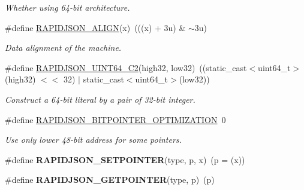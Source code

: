 \begin{DoxyCompactItemize}
\begin{DoxyCompactList}\small\item\em Whether using 64-\/bit architecture. \end{DoxyCompactList}\item 
\#define \hyperlink{a00833_ga583915242504c7fdb36e826f02f76242}{R\+A\+P\+I\+D\+J\+S\+O\+N\+\_\+\+A\+L\+I\+GN}(x)~(((x) + 3u) \& $\sim$3u)
\begin{DoxyCompactList}\small\item\em Data alignment of the machine. \end{DoxyCompactList}\item 
\#define \hyperlink{a00677_aaee1245f375a71be1ac9b8a07ba5fb8f}{R\+A\+P\+I\+D\+J\+S\+O\+N\+\_\+\+U\+I\+N\+T64\+\_\+\+C2}(high32,  low32)~((static\+\_\+cast$<$uint64\+\_\+t$>$(high32) $<$$<$ 32) $\vert$ static\+\_\+cast$<$uint64\+\_\+t$>$(low32))
\begin{DoxyCompactList}\small\item\em Construct a 64-\/bit literal by a pair of 32-\/bit integer. \end{DoxyCompactList}\item 
\#define \hyperlink{a00833_ga93fb983f78208d12c822376e1ea6d185}{R\+A\+P\+I\+D\+J\+S\+O\+N\+\_\+B\+I\+T\+P\+O\+I\+N\+T\+E\+R\+\_\+\+O\+P\+T\+I\+M\+I\+Z\+A\+T\+I\+ON}~0
\begin{DoxyCompactList}\small\item\em Use only lower 48-\/bit address for some pointers. \end{DoxyCompactList}\item 
\#define {\bfseries R\+A\+P\+I\+D\+J\+S\+O\+N\+\_\+\+S\+E\+T\+P\+O\+I\+N\+T\+ER}(type,  p,  x)~(p = (x))\hypertarget{a00677_a113598c4750b3aab4de2782ff1865ed4}{}\label{a00677_a113598c4750b3aab4de2782ff1865ed4}

\item 
\#define {\bfseries R\+A\+P\+I\+D\+J\+S\+O\+N\+\_\+\+G\+E\+T\+P\+O\+I\+N\+T\+ER}(type,  p)~(p)\hypertarget{a00677_ab67ad54afdd78883907fd1ecd007573a}{}\label{a00677_ab67ad54afdd78883907fd1ecd007573a}


\end{DoxyCompactItemize}
